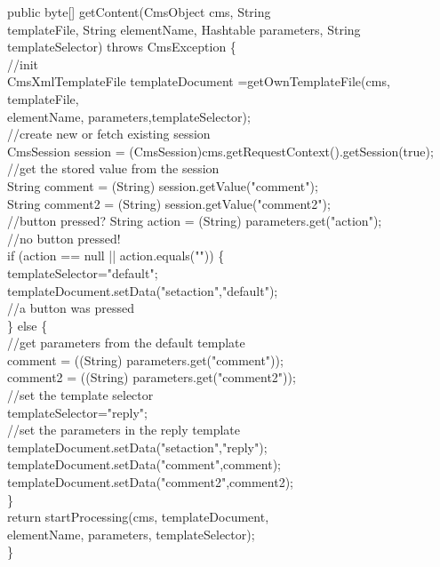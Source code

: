 \begin{java}
public byte[] getContent(CmsObject cms, String\\
templateFile, String elementName, Hashtable parameters, String
templateSelector) throws CmsException \{\\
//init\\
\jtabc        CmsXmlTemplateFile templateDocument =getOwnTemplateFile(cms, templateFile,\\
 elementName, parameters,templateSelector);\\
\jtabc        //create new or fetch existing session\\
\jtabc        CmsSession session = (CmsSession)cms.getRequestContext().getSession(true);\\
\jtabc        //get the stored value from the session\\
\jtabc        String comment = (String) session.getValue("comment");\\
\jtabc        String comment2 = (String) session.getValue("comment2");\\
//button pressed? String action = (String) parameters.get("action");\\
\jtabc        //no button pressed!\\
\jtabc        if (action == null || action.equals("")) \{\\
\jtabe                templateSelector="default";\\
\jtabe                templateDocument.setData("setaction","default");\\
\jtabc        //a button was pressed\\
\jtabc        \} else \{\\
\jtabd              //get parameters from the default template\\
\jtabd              comment = ((String) parameters.get("comment"));\\
\jtabd              comment2 = ((String) parameters.get("comment2"));\\
\jtabd              //set the template selector\\
\jtabd                templateSelector="reply";\\
\jtabd                //set the parameters in the reply template\\
\jtabd                templateDocument.setData("setaction","reply");\\
\jtabd                templateDocument.setData("comment",comment);\\
\jtabf                templateDocument.setData("comment2",comment2);\\
\}\\
return startProcessing(cms, templateDocument,\\
\jtabd      elementName, parameters, templateSelector);\\
\}\\
\end{java}


